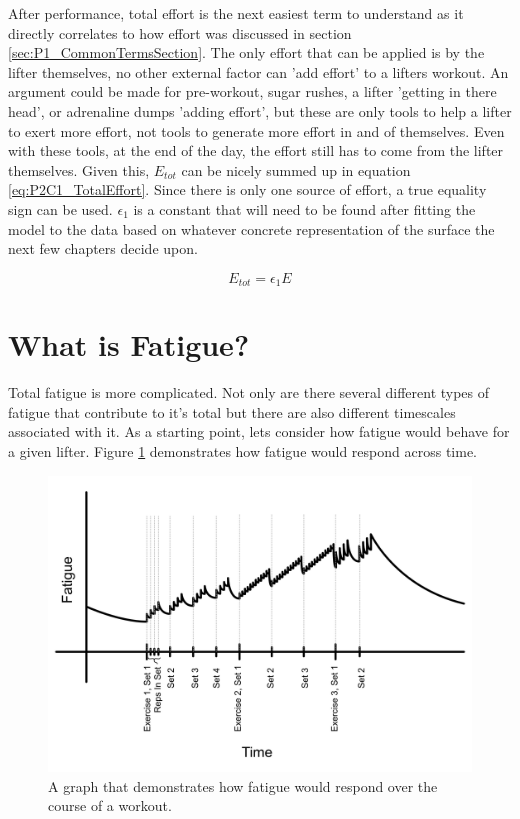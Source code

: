 After performance, total effort is the next easiest term to understand as it directly correlates to how effort was discussed in section \ref{sec:P1_CommonTermsSection}. The only effort that can be applied is by the lifter themselves, no other external factor can 'add effort' to a lifters workout. An argument could be made for pre-workout, sugar rushes, a lifter 'getting in there head', or adrenaline dumps 'adding effort', but these are only tools to help a lifter to exert more effort, not tools to generate more effort in and of themselves. Even with these tools, at the end of the day, the effort still has to come from the lifter themselves. Given this, $E_{tot}$ can be nicely summed up in equation \ref{eq:P2C1_TotalEffort}. Since there is only one source of effort, a true equality sign can be used. $\epsilon_1$ is a constant that will need to be found after fitting the model to the data based on whatever concrete representation of the surface the next few chapters decide upon.

\begin{equation}
	\label{eq:P2C1_TotalEffort}
	E_{tot}=\epsilon_1 E
\end{equation}


\section{What is Fatigue?}
\label{sec:P2C1_WhatIsFatigue}

Total fatigue is more complicated. Not only are there several different types of fatigue that contribute to it's total but there are also different timescales associated with it. As a starting point, lets consider how fatigue would behave for a given lifter. Figure \ref{fig:P2C1_GlobalFatigueGraph} demonstrates how fatigue would respond across time.

\begin{figure}[htb]
    \centering
    \includegraphics[scale=0.55]{images/p2/ch1/FatigueGraph.png}
    \caption{A graph that demonstrates how fatigue would respond over the course of a workout.}
    \label{fig:P2C1_GlobalFatigueGraph}
\end{figure}

